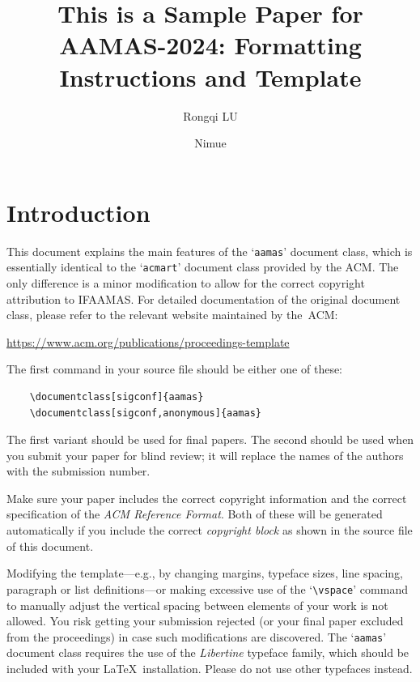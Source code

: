 \documentclass[sigconf]{aamas}
\title[AAMAS-2024 Formatting Instructions]
	{ This is a Sample Paper for AAMAS-2024: Formatting Instructions and Template}
\author{Rongqi LU}
\affiliation{
	\institution{Xidian University}
	\city{Xian}
	\country{CHINA}}
\author{Nimue}
\affiliation{
	\institution{The Lady's Lake}
	\city{Avalon}
	\country{United Kingdom}}
\begin{document}

\pagestyle{fancy}
\fancyhead{}


\maketitle


\section{Introduction}

This document explains the main features of the `\texttt{aamas}' 
document class, which is essentially identical to the `\texttt{acmart}'
document class provided by the ACM. The only difference is a minor 
modification to allow for the correct copyright attribution to IFAAMAS.
For detailed documentation of the original document class, please refer
to the relevant website maintained by the~ACM:
%
\begin{center}
\url{https://www.acm.org/publications/proceedings-template}
\end{center}
%
The first command in your source file should be either one of these:
\begin{verbatim}
    \documentclass[sigconf]{aamas}
    \documentclass[sigconf,anonymous]{aamas}
\end{verbatim}
%
The first variant should be used for final papers. The second should be
used when you submit your paper for blind review; it will replace the 
names of the authors with the submission number.

Make sure your paper includes the correct copyright information and 
the correct specification of the \emph{ACM Reference Format}. Both of 
these will be generated automatically if you include the correct 
\emph{copyright block} as shown in the source file of this document.

Modifying the template---e.g., by changing margins, typeface sizes, 
line spacing, paragraph or list definitions---or making excessive use 
of the `\verb|\vspace|' command to manually adjust the vertical spacing 
between elements of your work is not allowed. You risk getting your 
submission rejected (or your final paper excluded from the proceedings) 
in case such modifications are discovered. The `\texttt{aamas}' document 
class requires the use of the \textit{Libertine} typeface family, which 
should be included with your \LaTeX\ installation. Please do not use 
other typefaces instead.
\end{document}
